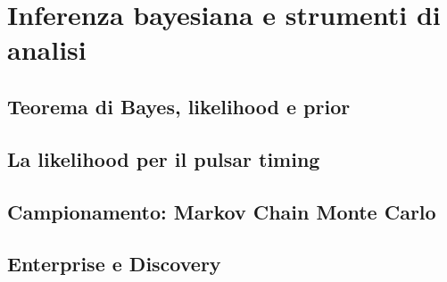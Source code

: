 
\chapter{Inferenza bayesiana e strumenti di analisi} \label{chpt:inferenza}
\sloppy

\section{Teorema di Bayes, likelihood e prior} \label{sec:bayes}

\section{La likelihood per il pulsar timing} \label{sec:likelihood_PTA}

\section{Campionamento: Markov Chain Monte Carlo} \label{sec:MCMC}

\section{Enterprise e Discovery} \label{sec:enterprise_discovery}
